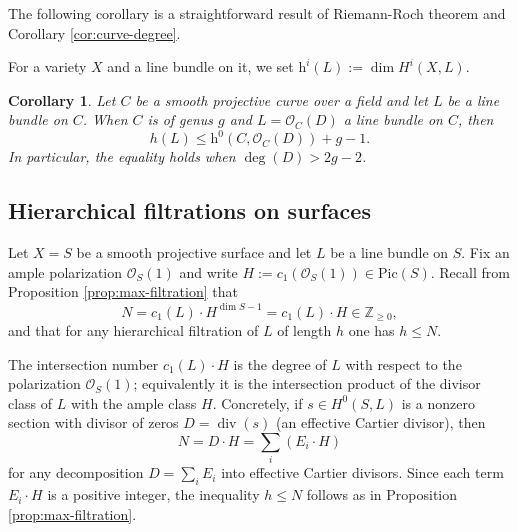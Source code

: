 \documentclass[14pt]{amsart}
\theoremstyle{plain}
\newtheorem{cor}[thm]{\bf Corollary}
\theoremstyle{definition}
\theoremstyle{remark}
\theoremstyle{example}
\def \h{\mathrm{h}}
\def \O{\mathcal{O}}
\def \Pic{\mathrm{Pic}}
\begin{document}
The following corollary is a straightforward result of Riemann-Roch theorem and Corollary \ref{cor:curve-degree}.

For a variety $X$ and a line bundle on it, we set $\h^i(L):=\dim H^i(X,L)$.

\begin{cor}
Let $C$ be a smooth projective curve over a field and let $L$ be a line bundle on $C$. When $C$ is of genus $g$ and $L=\O_C(D)$ a line bundle on $C$, then
\begin{equation}
h(L)\leq\h^0(C,\O_C(D))+g-1.
\label{Eq.h(L)leq}
\end{equation}
In particular, the equality holds when $\deg(D)>2g-2$.
\end{cor}

\subsection{Hierarchical filtrations on surfaces}

Let $X=S$ be a smooth projective surface and let $L$ be a line bundle on $S$.
Fix an ample polarization $\O_S(1)$ and write $H:=c_1(\O_S(1))\in\Pic(S)$.
Recall from Proposition \ref{prop:max-filtration} that
$$
N  =  c_1(L)\cdot H^{\dim S-1}  =  c_1(L)\cdot H \in\mathbb{Z}_{\ge 0},
$$
and that for any hierarchical filtration of $L$ of length $h$ one has $h\le N$.

The intersection number $c_1(L)\cdot H$ is the degree of $L$ with respect to the
polarization $\O_S(1)$; equivalently it is the intersection product of the divisor
class of $L$ with the ample class $H$. Concretely, if $s\in H^0(S,L)$ is a
nonzero section with divisor of zeros $D=\operatorname{div}(s)$ (an effective Cartier
divisor), then
$$
N  =  D\cdot H  =  \sum_{i} (E_i\cdot H)
$$
for any decomposition $D=\sum_i E_i$ into effective Cartier divisors. Since each
term $E_i\cdot H$ is a positive integer, the inequality $h\le N$ follows as in
Proposition \ref{prop:max-filtration}.
\end{document}
